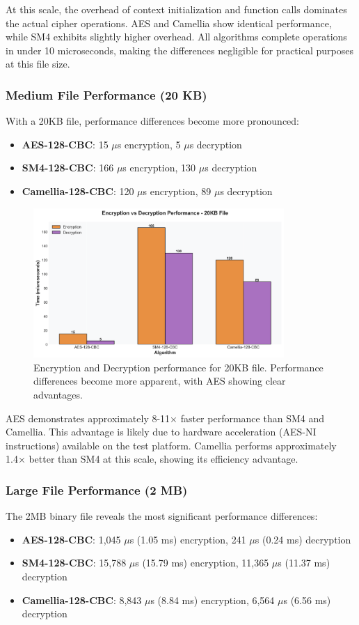 \documentclass[12pt,a4paper]{article}
\begin{document}
At this scale, the overhead of context initialization and function calls dominates the actual cipher operations. AES and Camellia show identical performance, while SM4 exhibits slightly higher overhead. All algorithms complete operations in under 10 microseconds, making the differences negligible for practical purposes at this file size.

\subsubsection{Medium File Performance (20 KB)}
With a 20KB file, performance differences become more pronounced:
\begin{itemize}
    \item \textbf{AES-128-CBC}: 15 $\mu$s encryption, 5 $\mu$s decryption
    \item \textbf{SM4-128-CBC}: 166 $\mu$s encryption, 130 $\mu$s decryption
    \item \textbf{Camellia-128-CBC}: 120 $\mu$s encryption, 89 $\mu$s decryption
\end{itemize}

\begin{figure}[h]
\centering
\includegraphics[width=0.85\textwidth]{performance_20KB.png}
\caption{Encryption and Decryption performance for 20KB file. Performance differences become more apparent, with AES showing clear advantages.}
\label{fig:perf_20kb}
\end{figure}

AES demonstrates approximately 8-11× faster performance than SM4 and Camellia. This advantage is likely due to hardware acceleration (AES-NI instructions) available on the test platform. Camellia performs approximately 1.4× better than SM4 at this scale, showing its efficiency advantage.

\subsubsection{Large File Performance (2 MB)}
The 2MB binary file reveals the most significant performance differences:
\begin{itemize}
    \item \textbf{AES-128-CBC}: 1,045 $\mu$s (1.05 ms) encryption, 241 $\mu$s (0.24 ms) decryption
    \item \textbf{SM4-128-CBC}: 15,788 $\mu$s (15.79 ms) encryption, 11,365 $\mu$s (11.37 ms) decryption
    \item \textbf{Camellia-128-CBC}: 8,843 $\mu$s (8.84 ms) encryption, 6,564 $\mu$s (6.56 ms) decryption
\end{itemize}
\end{document}
